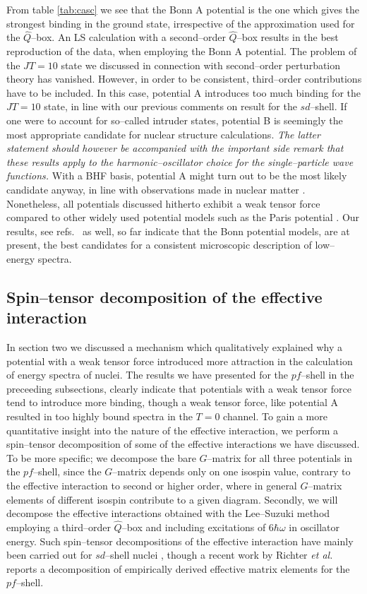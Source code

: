 From table \ref{tab:casc} we see that the Bonn A potential is the one which
gives the strongest binding in the ground state, irrespective of the
approximation used for the $\hat{Q}$--box.
An LS calculation with a second--order $\hat{Q}$--box 
results in the best reproduction of the data, when employing the Bonn A
potential. The problem
of the $JT=10$ state we discussed
in connection with second--order perturbation theory has vanished. However, in order
to be consistent, third--order contributions have to be included. In this case, 
potential A introduces too much binding for the $JT=10$ state, in line with our 
previous comments on result for the $sd$--shell. 
If one were to account for so--called intruder states, potential B is seemingly the 
most appropriate candidate for nuclear structure calculations. {\em The latter 
statement should however be accompanied with the important side remark that
these results apply to the harmonic--oscillator  choice for the
single--particle wave functions.} With a BHF basis, potential A might turn out
to be the most likely candidate anyway, in line with observations
made in nuclear matter \cite{mb90}. 
Nonetheless, all potentials discussed hitherto exhibit a 
weak tensor force compared to other widely used potential models such as the
Paris potential \cite{paris80}. Our results, see refs.\ \cite{heho92,hok92} as well,
so far indicate that the Bonn potential models, are at present, 
the best candidates for a consistent microscopic description of low--energy
spectra.


\subsection{Spin--tensor decomposition of the effective interaction}
In section two we discussed a mechanism which qualitatively
explained why a potential with a weak tensor force introduced more
attraction in the calculation of energy spectra of nuclei.
The results we have presented for the $pf$--shell in the preceeding
subsections, clearly indicate that potentials with a weak tensor
force tend to introduce more binding, though a weak tensor
force, like potential A resulted in too highly bound spectra in
the $T=0$ channel.
To gain a more quantitative insight into the nature of the effective
interaction, we perform a spin--tensor decomposition
of some of the effective interactions we have discussed. To be more
specific; we decompose the bare $G$--matrix for all three potentials
in the $pf$--shell, since the $G$--matrix depends only on one
isospin value, contrary to the effective interaction to second or higher
order, where in general $G$--matrix elements of different isospin 
contribute to a given diagram.
Secondly, we will decompose the
effective interactions obtained with the Lee--Suzuki method employing
a third--order $\hat{Q}$--box and including excitations of $6\hbar\omega$ in
oscillator energy.
Such spin--tensor decompositions of the effective interaction
have mainly been carried out for $sd$--shell nuclei
\cite{skd83,brown88,os92}, though a
recent work by Richter {\em et al.} \cite{richt91} reports a
decomposition of empirically derived effective matrix elements
for the $pf$--shell.

